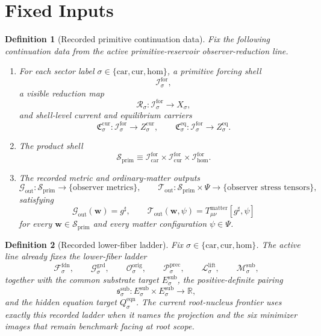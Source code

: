 \documentclass[11pt]{article}
\newcommand{\CompletedMetric}{g^{\sharp}}
\newcommand{\MatterSpace}{\Psi}
\newcommand{\Car}{\mathrm{car}}
\newcommand{\Cur}{\mathrm{cur}}
\newcommand{\Hom}{\mathrm{hom}}
\newcommand{\ForSpace}[1]{\mathcal I_{#1}^{\mathrm{for}}}
\newcommand{\PrimShell}{\mathcal S_{\mathrm{prim}}}
\newcommand{\Reduction}[1]{\mathcal R_{#1}}
\newcommand{\CurrentCarrier}[1]{\mathfrak C_{#1}^{\mathrm{cur}}}
\newcommand{\EqCarrier}[1]{\mathfrak C_{#1}^{\mathrm{eq}}}
\newcommand{\MetricOut}{\mathscr G_{\mathrm{out}}}
\newcommand{\MatterOut}{\mathscr T_{\mathrm{out}}}
\newcommand{\EqnTarget}[1]{Q_{#1}^{\mathrm{eqn}}}
\newcommand{\FoundSpace}[1]{\mathcal F_{#1}^{\mathrm{fdn}}}
\newcommand{\GroundSpace}[1]{\mathcal G_{#1}^{\mathrm{grd}}}
\newcommand{\OrigSpace}[1]{\mathcal O_{#1}^{\mathrm{orig}}}
\newcommand{\PrecSpace}[1]{\mathcal P_{#1}^{\mathrm{prec}}}
\newcommand{\LiftSpace}[1]{\mathcal L_{#1}^{\mathrm{lift}}}
\newcommand{\SubSpace}[1]{\mathcal M_{#1}^{\mathrm{sub}}}
\newcommand{\SubTarget}[1]{E_{#1}^{\mathrm{sub}}}
\newcommand{\SubPair}[1]{\mathfrak s_{#1}^{\mathrm{sub}}}
\newtheorem{definition}{Definition}
\begin{document}
\section{Fixed Inputs}

\begin{definition}[Recorded primitive continuation data]
\label{def:fixed}
Fix the following continuation data from the active primitive-reservoir observer-reduction line.
\begin{enumerate}
    \item For each sector label \(\sigma\in\{\Car,\Cur,\Hom\}\), a primitive forcing shell
    \[
    \ForSpace{\sigma},
    \]
    a visible reduction map
    \[
    \Reduction{\sigma}:\ForSpace{\sigma}\to X_{\sigma},
    \]
    and shell-level current and equilibrium carriers
    \[
    \CurrentCarrier{\sigma}:\ForSpace{\sigma}\to Z_{\sigma}^{\mathrm{cur}},
    \qquad
    \EqCarrier{\sigma}:\ForSpace{\sigma}\to Z_{\sigma}^{\mathrm{eq}}.
    \]
    \item The product shell
    \[
    \PrimShell
    \equiv
    \ForSpace{\Car}\times \ForSpace{\Cur}\times \ForSpace{\Hom}.
    \]
    \item The recorded metric and ordinary-matter outputs
    \[
    \MetricOut:\PrimShell\to\{\text{observer metrics}\},
    \qquad
    \MatterOut:\PrimShell\times\MatterSpace\to\{\text{observer stress tensors}\},
    \]
    satisfying
    \begin{equation}
    \MetricOut(\mathbf w)=\CompletedMetric,
    \qquad
    \MatterOut(\mathbf w,\psi)
    =
    T_{\mu\nu}^{\mathrm{matter}}[\CompletedMetric,\psi]
    \label{eq:fixedoutputs}
    \end{equation}
    for every \(\mathbf w\in\PrimShell\) and every matter configuration \(\psi\in\MatterSpace\).
\end{enumerate}
\end{definition}

\begin{definition}[Recorded lower-fiber ladder]
\label{def:ladder}
Fix \(\sigma\in\{\Car,\Cur,\Hom\}\). The active line already fixes the lower-fiber ladder
\[
\FoundSpace{\sigma},
\qquad
\GroundSpace{\sigma},
\qquad
\OrigSpace{\sigma},
\qquad
\PrecSpace{\sigma},
\qquad
\LiftSpace{\sigma},
\qquad
\SubSpace{\sigma},
\]
together with the common substrate target \(\SubTarget{\sigma}\), the positive-definite pairing
\[
\SubPair{\sigma}:
\SubTarget{\sigma}\times\SubTarget{\sigma}\to\mathbb R,
\]
and the hidden equation target \(\EqnTarget{\sigma}\). The current root-nucleus frontier uses exactly this recorded ladder when it names the projection and the six minimizer images that remain benchmark facing at root scope.
\end{definition}
\end{document}
